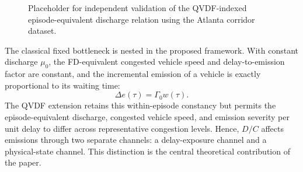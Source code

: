
\begin{figure}[t]
\centering
{}
\caption{Placeholder for independent validation of the QVDF-indexed
episode-equivalent discharge relation using the Atlanta corridor dataset.}
\label{fig:atlanta_validation_placeholder}
\end{figure}



The classical fixed bottleneck is nested in the proposed framework. With
constant discharge $\mu_0$, the FD-equivalent congested vehicle speed and
delay-to-emission factor are constant, and the incremental emission of a
vehicle is exactly proportional to its waiting time:
\begin{equation}
\Delta e(\tau)=\Gamma_0w(\tau).
\end{equation}
The QVDF extension retains this within-episode constancy but permits the
episode-equivalent discharge, congested vehicle speed, and emission severity
per unit delay to differ across representative congestion levels. Hence,
$D/C$ affects emissions through two separate channels: a delay-exposure
channel and a physical-state channel. This distinction is the central
theoretical contribution of the paper.

